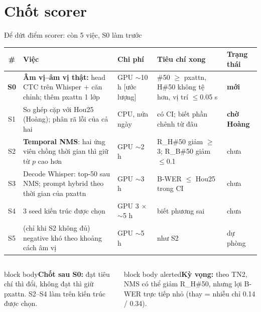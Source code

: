 \documentclass[aspectratio=169,xcolor=table]{beamer}
\newcommand{\bad}[1]{\textcolor{RiskRed}{\textbf{#1}}}
\newcommand{\src}[1]{{\tiny\color{TextGray}[#1]}}
\newcommand{\nbox}[2][block body]{\begin{beamercolorbox}[sep=0.45em,rounded=true]{#1}\footnotesize #2\end{beamercolorbox}}
\begin{document}
\section{Chốt scorer}
\begin{frame}{Để dứt điểm scorer: còn 5 việc, S0 làm trước}
\centering\scriptsize\setlength{\tabcolsep}{4pt}
\begin{tabular}{cL{5.3cm}L{2.0cm}L{3.7cm}L{1.7cm}}
\toprule
\# & Việc & Chi phí & Tiêu chí xong & Trạng thái\\
\midrule
\textbf{S0} & \textbf{Âm vị--âm vị thật:} head CTC trên Whisper + căn chỉnh; thêm pxattn 1 lớp & GPU $\sim$10 h \src{ước lượng} & \#50 $\geq$ pxattn, H\#50 không tệ hơn, vị trí $\leq$0.05 s & \bad{mới}\\
S1 & So ghép cặp với Hou25 (Hoàng); phân rã lỗi của cả hai & CPU, nửa ngày & có CI; biết phần chênh từ đâu & \bad{chờ Hoàng}\\
S2 & \textbf{Temporal NMS}: hai ứng viên chồng thời gian thì giữ từ $p$ cao hơn & GPU $\sim$2 h & R\_H\#50 giảm $\geq$3; R\_B\#50 giảm $\leq$0.1 & chưa\\
S3 & Decode Whisper: top-50 sau NMS; prompt hybrid theo thời gian của pxattn & GPU $\sim$3 h & B-WER $\leq$ Hou25 trong CI & chưa\\
S4 & 3 seed kiến trúc được chọn & GPU 3 $\times$ $\sim$5 h & biết phương sai & chưa\\
\midrule
S5 & (chỉ khi S2 không đủ) negative khó theo khoảng cách âm vị & GPU $\sim$5 h & như S2 & dự phòng\\
\bottomrule
\end{tabular}\par
\vspace{0.25cm}\raggedright
\begin{columns}[T]
\begin{column}{0.48\textwidth}
\nbox{\textbf{Chốt sau S0:} đạt tiêu chí thì đổi, không đạt thì giữ pxattn. S2--S4 làm trên kiến trúc được chọn.}
\end{column}
\begin{column}{0.48\textwidth}
\nbox[block body alerted]{\textbf{Kỳ vọng:} theo TN2, NMS có thể giảm R\_H\#50, nhưng lợi B-WER trực tiếp nhỏ (thay = nhiễu chỉ 0.14 / 0.34).}
\end{column}
\end{columns}
\end{frame}
\end{document}
